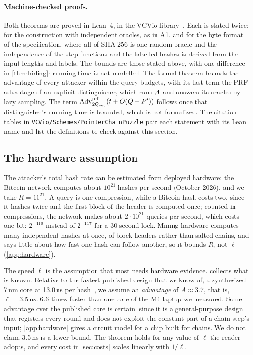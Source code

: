 \paragraph{Machine-checked proofs.}
Both theorems are proved in Lean~4, in the VCVio library~\cite{VCVio}. Each is stated twice: for the construction with independent oracles, as in A1, and for the byte format of the specification, where all of SHA-256 is one random oracle and the independence of the step functions and the labelled hashes is derived from the input lengths and labels. The bounds are those stated above, with one difference in \cref{thm:hiding}: running time is not modelled. The formal theorem bounds the advantage of every attacker within the query budgets, with its last term the PRF advantage of an explicit distinguisher, which runs $\mathcal{A}$ and answers its oracles by lazy sampling. The term $\mathrm{Adv}^{\mathrm{prf}}_{2Q_{\mathrm{enc}}}(t + O(Q + P'))$ follows once that distinguisher's running time is bounded, which is not formalized. The citation tables in \texttt{VCVio/Schemes/PointerChainPuzzle} pair each statement with its Lean name and list the definitions to check against this section.

\subsection{The hardware assumption}\label{sec:pricing}

The attacker's total hash rate can be estimated from deployed hardware: the Bitcoin network computes about $10^{21}$ hashes per second (October 2026), and we take $R = 10^{21}$. A query is one compression, while a Bitcoin hash costs two, since it hashes twice and the first block of the header is computed once; counted in compressions, the network makes about $2 \cdot 10^{21}$ queries per second, which costs one bit: $2^{-116}$ instead of $2^{-117}$ for a 30-second lock. Mining hardware computes many independent hashes at once, of block headers rather than salted chains, and says little about how fast one hash can follow another, so it bounds $R$, not $\ell$ (\cref{app:hardware}).

The speed $\ell$ is the assumption that most needs hardware evidence.  collects what is known. Relative to the fastest published design that we know of, a synthesized 7\,nm core at 13.0\,ns per hash~\cite{BCF+20}, we assume an \emph{advantage} of $A \approx 3.7$, that is, $\ell = 3.5$\,ns: 6.6 times faster than one core of the M4 laptop we measured. Some advantage over the published core is certain, since it is a general-purpose design that registers every round and does not exploit the constant part of a chain step's input; \cref{app:hardware} gives a circuit model for a chip built for chains. We do not claim 3.5\,ns is a lower bound. The theorem holds for any value of $\ell$ the reader adopts, and every cost in \cref{sec:costs} scales linearly with $1/\ell$.

